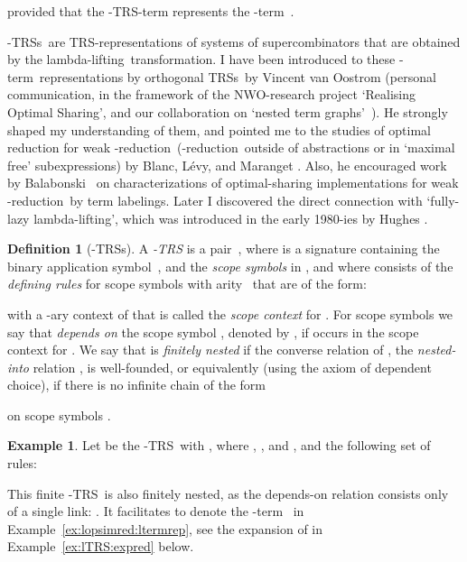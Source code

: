 \documentclass[
submission
]{dmtcs-episciences-tampered}
\newcommand{\nb}{\nobreakdash}
\newcommand{\TRS}{TRS}
\newcommand{\TRSs}{TRSs}
\newcommand{\lambdaterm}{\nb-term}
\newcommand{\lambdalifting}{lambda-lif\-ting}
\newcommand{\betareduction}{\nb-re\-duc\-tion}
\newcommand{\TRSrepresentation}{\TRS\nb-re\-pre\-sen\-ta\-tion}
\newcommand{\lTRS}{\hspace*{-0.5pt}\nb-\hspace*{-0.5pt}\TRS}
\newcommand{\lTRSs}{\lTRS{s}}
\theoremstyle{plain}
\theoremstyle{definition}
\newtheorem{definition}[theorem]{Definition}
\newtheorem{example}[theorem]{Example}
\begin{document}
provided that the \lTRS\nb-term  represents the \lambdaterm~.

\lTRSs\ are \TRSrepresentation{s} of systems of supercombinators that are obtained by the \lambdalifting\ transformation.
I have been introduced to these \lambdaterm\ representations by orthogonal \TRSs\ by Vincent van Oostrom
(personal communication, in the framework of the NWO-research project `Realising Optimal Sharing',
 and our collaboration on `nested term graphs'~\cite{grab:oost:2015}). 
He strongly shaped my understanding of them, and pointed me to the studies of optimal reduction for weak \betareduction\ 
(\betareduction\ outside of abstractions or in `maximal free' subexpressions)
by Blanc, L\'{e}vy, and Maranget \cite{blan:levy:mara:2005}.
Also, he encouraged work by Balabonski~\cite{bala:2012} on characterizations of optimal-sharing implementations for weak \betareduction\ 
by term labelings.
Later I discovered the direct connection with `fully-lazy \lambdalifting',
which was introduced in the early 1980-ies by Hughes \cite{hugh:1982:report,hugh:1982}. 


\begin{definition}[\lTRS{s}]\label{def:lTRS}
  A \emph{\lTRS}  
  is a pair~, 
  where  is a signature containing the binary application symbol~,
  and the \emph{scope symbols} in ,
  and where 
  consists of the \emph{defining rules}  for scope symbols  with arity~
  that are of the form: 
  
  with  a \nb-ary context of  
  that is called the \emph{scope context} for .
  For scope symbols  
  we say that  \emph{depends on} the scope symbol ,
  denoted by ,
if  occurs in the scope context  for .
We say that  is \emph{finitely nested} 
  if the converse relation of , the \emph{nested-into} relation , is well-founded,
  or equivalently (using the axiom of dependent choice),
  if there is no infinite chain of the form
  
  on scope symbols .  
\end{definition}

\begin{example}\label{ex:lTRS}
  Let  be the \lTRS\ 
  with ,
  where , , and ,
and the following set  of rules:
  \begin{center}
    
  \end{center}  
This finite \lTRS\
  is also finitely nested, as the depends-on relation consists only of a single link: .  
  It facilitates to denote the \lambdaterm~ in Example~\ref{ex:lopsimred:ltermrep},
  see the expansion of  in Example~\ref{ex:lTRS:expred} below. 
\end{example}  
\end{document}
